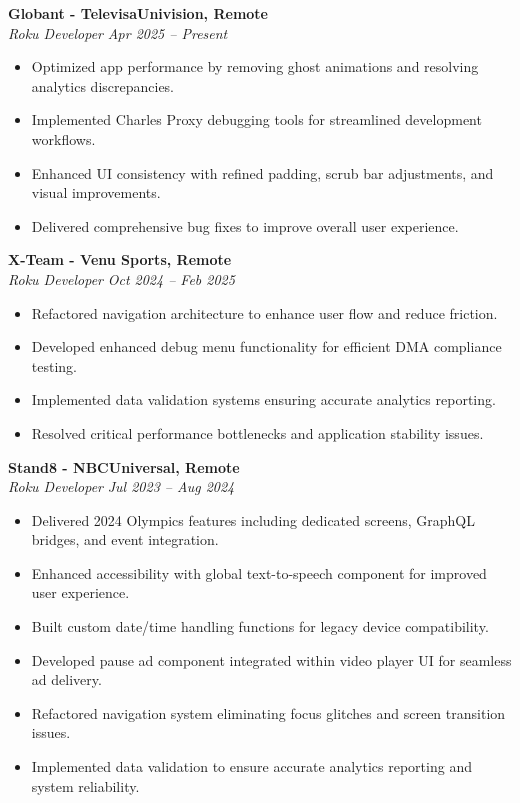 \documentclass[11pt,a4paper]{article}
\newlength{\jobspacing}
\begin{document}
\textbf{Globant - TelevisaUnivision, Remote} \\
\emph{Roku Developer} \hfill \textit{Apr 2025 -- Present} \\
\begin{itemize}[leftmargin=*]
    \item Optimized app performance by removing ghost animations and resolving analytics discrepancies.
    \item Implemented Charles Proxy debugging tools for streamlined development workflows.
    \item Enhanced UI consistency with refined padding, scrub bar adjustments, and visual improvements.
    \item Delivered comprehensive bug fixes to improve overall user experience.
\end{itemize}

\vspace{\jobspacing}

\textbf{X-Team - Venu Sports, Remote} \\
\emph{Roku Developer} \hfill \textit{Oct 2024 -- Feb 2025} \\
\begin{itemize}[leftmargin=*]
    \item Refactored navigation architecture to enhance user flow and reduce friction.
    \item Developed enhanced debug menu functionality for efficient DMA compliance testing.
    \item Implemented data validation systems ensuring accurate analytics reporting.
    \item Resolved critical performance bottlenecks and application stability issues.
\end{itemize}

\vspace{\jobspacing}

\textbf{Stand8 - NBCUniversal, Remote} \\
\emph{Roku Developer} \hfill \textit{Jul 2023 -- Aug 2024} \\
\begin{itemize}[leftmargin=*]
    \item Delivered 2024 Olympics features including dedicated screens, GraphQL bridges, and event integration.
    \item Enhanced accessibility with global text-to-speech component for improved user experience.
    \item Built custom date/time handling functions for legacy device compatibility.
    \item Developed pause ad component integrated within video player UI for seamless ad delivery.
    \item Refactored navigation system eliminating focus glitches and screen transition issues.
    \item Implemented data validation to ensure accurate analytics reporting and system reliability.
\end{itemize}
\end{document}
